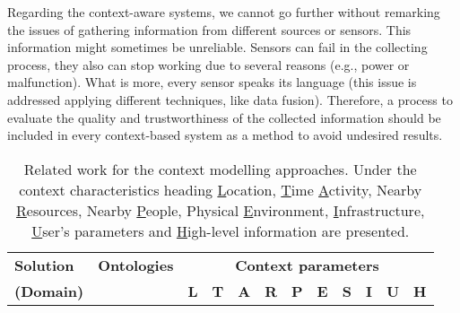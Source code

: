 Regarding the context-aware systems, we cannot go further without remarking the 
issues of gathering information from different sources or sensors. This 
information might sometimes be unreliable. Sensors can fail in the collecting 
process, they also can stop working due to several reasons (e.g., power or 
malfunction). What is more, every sensor speaks its language (this issue is 
addressed applying different techniques, like data fusion). Therefore, a process 
to evaluate the quality and trustworthiness of the collected information should 
be included in every context-based system as a method to avoid undesired results.

\begin{table}
 \caption{Related work for the context modelling approaches. Under the context
  characteristics heading \underline{L}ocation, \underline{T}ime
  \underline{A}ctivity, Nearby \underline{R}esources, Nearby \underline{P}eople,
  Physical \underline{E}nvironment, \underline{I}nfrastructure, \underline{U}ser's
  parameters and \underline{H}igh-level information are presented.}
 \label{tbl:context_comparison}
 \footnotesize
 \centering

\begin{tabular}{l c c c c c c c c c c c }
  \hline 
 \textbf{Solution} & \textbf{Ontologies} & \multicolumn{10}{c}{\textbf{Context parameters}} \\
 
 \textbf{(Domain)} & & \textbf{L} & \textbf{T} & \textbf{A} & \textbf{R} & \textbf{P} & \textbf{E} & \textbf{S} & \textbf{I} & \textbf{U} & \textbf{H}\\
    \hline 
        

\end{tabular}
\end{table}
